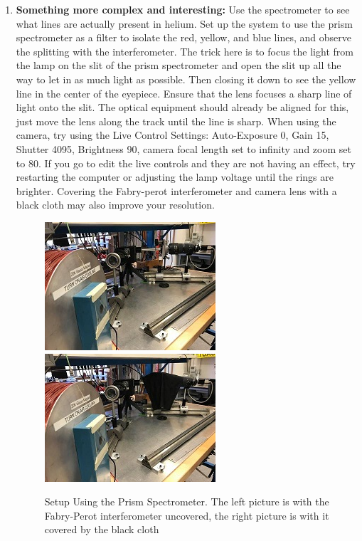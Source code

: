 \documentclass{../lab}
\begin{document}
\begin{enumerate}
    \item \textbf{Something more complex and interesting:} Use the spectrometer to see what lines are actually present in helium. Set up the system to use the prism spectrometer as a filter to isolate the red, yellow, and blue lines, and observe the splitting with the interferometer. The trick here is to focus the light from the lamp on the slit of the prism spectrometer and open the slit up all the way to let in as much light as possible. Then closing it down to see the yellow line in the center of the eyepiece. Ensure that the lens focuses a sharp line of light onto the slit. The optical equipment should already be aligned for this, just move the lens along the track until the line is sharp. When using the camera, try using the Live Control Settings: Auto-Exposure 0, Gain 15, Shutter 4095, Brightness 90, camera focal length set to infinity and zoom set to 80. If you go to edit the live controls and they are not having an effect, try restarting the computer or adjusting the lamp voltage until the rings are brighter. Covering the Fabry-perot interferometer and camera lens with a black cloth may also improve your resolution.
    
    \begin{figure}[H]
    \centering
        \href{http://experimentationlab.berkeley.edu/sites/default/files/ATM/physical-zeeman-setup_0.jpg}{\includegraphics[width=0.4\linewidth]{images/physical-zeeman-setup_0.jpg}}
        \href{http://experimentationlab.berkeley.edu/sites/default/files/ATM/physical-setup-zeeman_covered_0.jpg}{\includegraphics[width=0.4\linewidth]{images/physical-setup-zeeman_covered_0.jpg}}
        \caption{Setup Using the Prism Spectrometer. The left picture is with the Fabry-Perot interferometer uncovered, the right picture is with it covered by the black cloth}
        \label{physical-zeeman-setup, physical-setup-zeeman_covered}
    \end{figure}
    

\end{enumerate}
\end{document}
